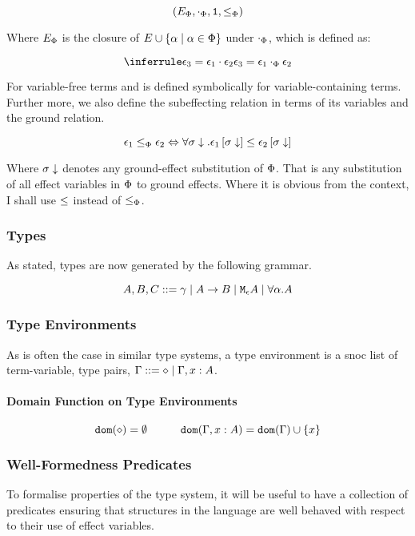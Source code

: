 \documentclass{Report}
\begin{document}
\begin{equation}
    (E_\P, \dotp, \1, \subeffectp)
\end{equation}

Where $E_\P$ is the closure of $E\cup \left\{\a\mid\a\in\P\right\}$ under $\dotp$, which is defined as:

\begin{equation}
    \treeruleI{\e_3 = \e_1\dot\e_2}{\e_3 = \e_1\dotp\e_2}
\end{equation} 

For variable-free terms and is defined symbolically for variable-containing terms. Further more, we also define the subeffecting relation in terms of its variables and the ground relation.

\begin{equation}
    \e_1 \subeffectp \e_2 \Leftrightarrow \forall \si\downarrow. \e_1\sub{\si\downarrow} \subeffect \e_2\sub{\si\downarrow}
\end{equation}

Where $\si\downarrow$ denotes any ground-effect substitution of $\P$. That is any substitution of all effect variables in $\P$ to ground effects. Where it is obvious from the context, I shall use $\subeffect$ instead of $\subeffectp$.


\subsubsection{Types}
As stated, types are now generated by the following grammar.

$$ A, B, C \gens \ground \mid \ab \mid \mea \mid \all{\a}{A}$$
  
\subsubsection{Type Environments}
As is often the case in similar type systems, a type environment is a snoc list of term-variable, type pairs, $\G \gens \nil \mid \gax$.

\paragraph{Domain Function on Type Environments}

\[
    \dom{\nil} = \emptyset
    \quad\quad\quad
    \dom{\gax} =  \dom{\G}  \cup \left\{x \right\}
\]

\subsubsection{Well-Formedness Predicates}
To formalise properties of the type system, it will be useful to have a collection of predicates ensuring that structures in the language are well behaved with respect to their use of effect variables.
\end{document}
